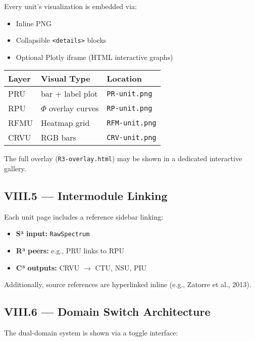 Every unit’s visualization is embedded via:

\begin{itemize}
    \item Inline PNG
    \item Collapsible \texttt{<details>} blocks
    \item Optional Plotly iframe (HTML interactive graphs)
\end{itemize}

\begin{center}
\begin{tabular}{|l|l|l|}
\hline
\textbf{Layer} & \textbf{Visual Type} & \textbf{Location} \\
\hline
PRU & bar + label plot & \texttt{PR-unit.png} \\
RPU & $\Phi$ overlay curves & \texttt{RP-unit.png} \\
RFMU & Heatmap grid & \texttt{RFM-unit.png} \\
CRVU & RGB bars & \texttt{CRV-unit.png} \\
\hline
\end{tabular}
\end{center}

The full overlay (\texttt{R3-overlay.html}) may be shown in a dedicated interactive gallery.

\subsection*{VIII.5 — Intermodule Linking}

Each unit page includes a reference sidebar linking:

\begin{itemize}
    \item \textbf{S³ input:} \texttt{RawSpectrum}
    \item \textbf{R³ peers:} e.g., PRU links to RPU
    \item \textbf{C³ outputs:} CRVU $\rightarrow$ CTU, NSU, PIU
\end{itemize}

Additionally, source references are hyperlinked inline (e.g., Zatorre et al., 2013).

\subsection*{VIII.6 — Domain Switch Architecture}

The dual-domain system is shown via a toggle interface:

